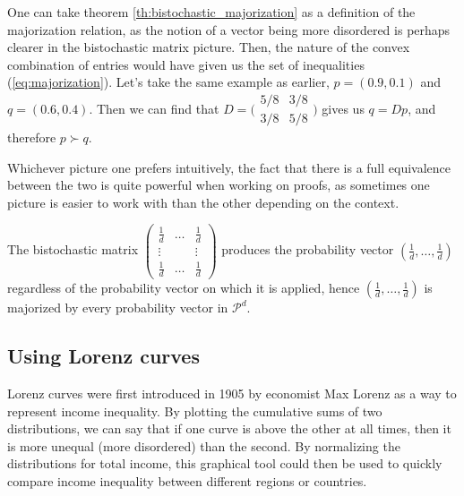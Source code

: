 One can take theorem \ref{th:bistochastic_majorization} as a definition of the majorization relation, as the notion of a vector being more disordered is perhaps clearer in the bistochastic matrix picture. Then, the nature of the convex combination %
of entries would have given us the set of inequalities (\ref{eq:majorization}). Let's take the same example as earlier, $p = (0.9, 0.1)$ and $q = (0.6, 0.4)$. Then we can find that $D = \Big(\begin{smallmatrix}
                                                                                                    5/8 & 3/8 \\
                                                                                                    3/8 & 5/8
                                                                                                \end{smallmatrix}\Big)$
gives us $q = Dp$, and therefore $p \succ q$.

Whichever picture one prefers intuitively, the fact that there is a full equivalence between the two is quite powerful when working on proofs, as sometimes one picture is easier to work with than the other depending on the context.

\begin{remark}
    The bistochastic matrix $\begin{pmatrix} \frac{1}{d} & \dots & \frac{1}{d} \\
                                                      \vdots & & \vdots \\
                                                      \frac{1}{d} & \dots & \frac{1}{d}
                             \end{pmatrix}$ 
    produces the probability vector $(\frac{1}{d}, \dots, \frac{1}{d})$ regardless of the probability vector on which it is applied, hence $(\frac{1}{d}, \dots, \frac{1}{d})$ is majorized by every probability vector in $\mathcal{P}^d$.
\end{remark}



\subsection{Using Lorenz curves}

Lorenz curves were first introduced in 1905 by economist Max Lorenz as a way to represent income inequality. By plotting the cumulative sums of two distributions, we can say that if one curve is above the other at all times, then it is more unequal (more disordered) than the second. By normalizing the distributions for total income, this graphical tool could then be used to quickly compare income inequality between different regions or countries.


